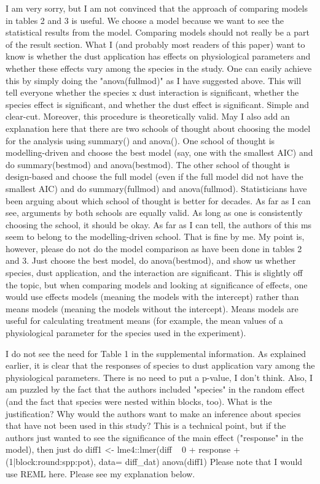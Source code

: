 \documentclass[parskip=half]{scrartcl}
\begin{document}
I am very sorry, but I am not convinced that the approach of comparing models in tables 2 and 3 is useful.
We choose a model because we want to see the statistical results from the model.  Comparing models should not really be a part of the result section.
What I (and probably most readers of this paper) want to know is whether the dust application has effects on physiological parameters and whether these effects vary among the species in the study.  One can easily achieve this by simply doing the "anova(fullmod)" as I have suggested above.
This will tell everyone whether the species x dust interaction is significant, whether the species effect is significant, and whether the dust effect is significant.  Simple and clear-cut.  Moreover, this procedure is theoretically valid.
May I also add an explanation here that there are two schools of thought about choosing the model for the analysis using summary() and anova().  One school of thought is modelling-driven and choose the best model (say, one with the smallest AIC) and do summary(bestmod) and anova(bestmod).  The other school of thought is design-based and choose the full model (even if the full model did not have the smallest AIC) and do summary(fullmod) and anova(fullmod).  Statisticians have been arguing about which school of thought is better for decades.  As far as I can see, arguments by both schools are equally valid. As long as one is consistently choosing the school, it should be okay.  As far as I can tell, the authors of this ms seem to belong to the modelling-driven school. That is fine by me. My point is, however, please do not do the model comparison as have been done in tables 2 and 3. Just choose the best model, do anova(bestmod), and show us whether species, dust application,
and the interaction are significant.
This is slightly off the topic, but when comparing models and looking at significance of effects, one would use effects models (meaning the models with the intercept) rather than means models (meaning the models without the intercept).  Means models are useful for calculating treatment means (for example, the mean values of a physiological parameter for the species used in the experiment).

I do not see the need for Table 1 in the supplemental information.
As explained earlier, it is clear that the responses of species to dust application vary among the physiological parameters.  There is no need to put a p-value, I don't think.
Also, I am puzzled by the fact that the authors included "species" in the random effect (and the fact that species were nested within blocks, too).  What is the justification?  Why would the authors want to make an inference about species that have not been used in this study?
This is a technical point, but if the authors just wanted to see the significance of the main effect ("response" in the model), then just do
diff1 <- lme4::lmer(diff ~ 0 + response + (1|block:round:spp:pot), data= diff_dat)
anova(diff1)
Please note that I would use REML here.  Please see my explanation below.
\end{document}
